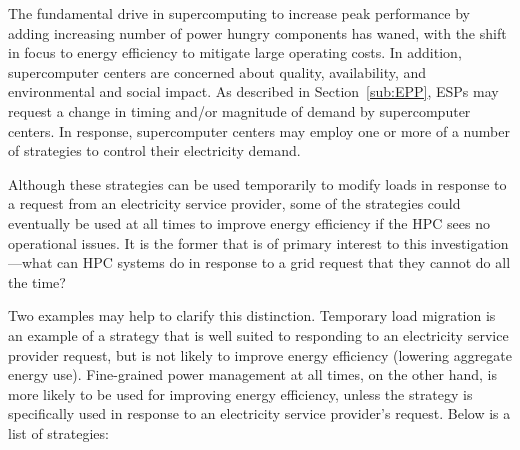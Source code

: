 The fundamental drive in supercomputing to increase peak performance by adding 
increasing number of power hungry components has waned, with the shift in focus to energy 
efficiency to mitigate large operating costs.
In addition, supercomputer centers are concerned about quality, availability, and 
environmental and social impact.
As described in Section~\ref{sub:EPP}, ESPs may request 
a change in timing and/or magnitude of demand by supercomputer centers.  
In response, supercomputer centers may employ one or more of a number of strategies to control their 
electricity demand.

Although these strategies can be used temporarily to modify loads in response to a request from an 
electricity service provider, some of the strategies could eventually be used at all times to improve energy 
efficiency if the HPC sees no operational issues. It is the former that is of primary interest to this 
investigation---what can HPC systems do in response to a grid request that they cannot do all the time? 

Two examples may help to clarify this distinction. Temporary load migration is an example of a strategy 
that is well suited to responding to an electricity service provider request, but is not likely to improve 
energy efficiency (lowering aggregate energy use). Fine-grained power management at all times, on 
the other hand, is more likely to be used for improving energy efficiency, unless the strategy is 
specifically used in response to an electricity service provider's request. 
Below is a list of strategies:


